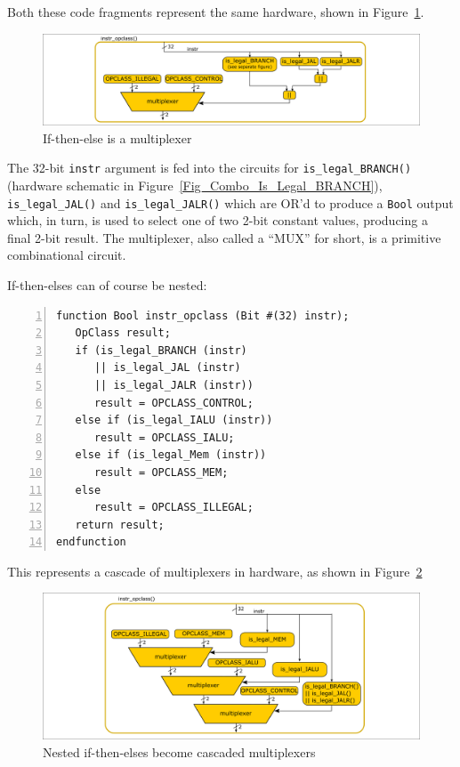 Both these code fragments represent the same hardware, shown in
Figure~\ref{Fig_Combo_Multiplexer}.
\begin{figure}[htbp]
  \centerline{\includegraphics[width=6in,angle=0]{ch040_Combo_Circuits/Figures/Fig_Combo_Multiplexer}}
  \caption{\label{Fig_Combo_Multiplexer}If-then-else is a multiplexer}
\end{figure}
The 32-bit \verb|instr| argument is fed into the circuits for
\verb|is_legal_BRANCH()| (hardware schematic in
Figure~\ref{Fig_Combo_Is_Legal_BRANCH}), \verb|is_legal_JAL()| and
\verb|is_legal_JALR()| which are OR'd to produce a \verb|Bool| output
which, in turn, is used to select one of two 2-bit constant values,
producing a final 2-bit result.  The multiplexer, also called a
``MUX'' for short, is a primitive combinational circuit.

If-then-elses can of course be nested:


\begin{Verbatim}[frame=single, numbers=left]
function Bool instr_opclass (Bit #(32) instr);
   OpClass result;
   if (is_legal_BRANCH (instr)
      || is_legal_JAL (instr)
      || is_legal_JALR (instr))
      result = OPCLASS_CONTROL;
   else if (is_legal_IALU (instr))
      result = OPCLASS_IALU;
   else if (is_legal_Mem (instr))
      result = OPCLASS_MEM;
   else
      result = OPCLASS_ILLEGAL;
   return result;
endfunction
\end{Verbatim}

This represents a cascade of multiplexers in hardware, as shown in
Figure~\ref{Fig_Combo_Multiplexer_Cascade}
\begin{figure}[htbp]
  \centerline{\includegraphics[width=6in,angle=0]{ch040_Combo_Circuits/Figures/Fig_Combo_Multiplexer_Cascade}}
  \caption{\label{Fig_Combo_Multiplexer_Cascade}Nested if-then-elses become cascaded multiplexers}
\end{figure}

